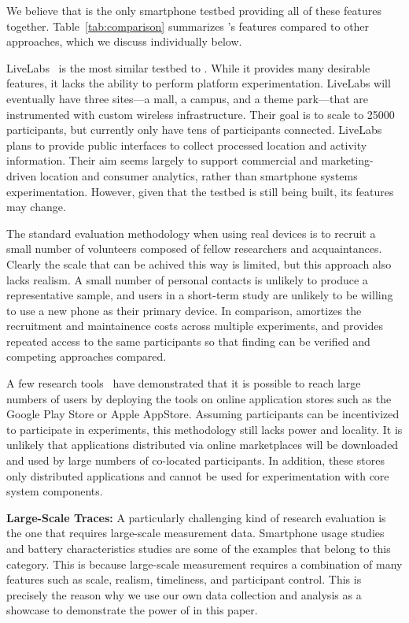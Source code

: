 We believe that \PhoneLab{} is the only smartphone testbed providing all of
these features together. Table~\ref{tab:comparison} summarizes \PhoneLab{}'s
features compared to other approaches, which we discuss individually below.

LiveLabs~\cite{livelabs} is the most similar testbed to \PhoneLab{}. While it
provides many desirable features, it lacks the ability to perform platform
experimentation. LiveLabs will eventually have three sites---a mall, a
campus, and a theme park---that are instrumented with custom wireless
infrastructure. Their goal is to scale to \num{25000} participants, but
currently only have tens of participants connected. LiveLabs plans to provide
public interfaces to collect processed location and activity information.
Their aim seems largely to support commercial and marketing-driven location
and consumer analytics, rather than smartphone systems experimentation.
However, given that the testbed is still being built, its features may
change.

The standard evaluation methodology when using real devices is to recruit a
small number of volunteers composed of fellow researchers and acquaintances.
Clearly the scale that can be achived this way is limited, but this approach
also lacks realism. A small number of personal contacts is unlikely to
produce a representative sample, and users in a short-term study are unlikely
to be willing to use a new phone as their primary device. In comparison,
\PhoneLab{} amortizes the recruitment and maintainence costs across multiple
experiments, and provides repeated access to the same participants so that
finding can be verified and competing approaches compared.

A few research tools~\cite{huang:mobisys:2010, zhang:codes:2010} have
demonstrated that it is possible to reach large numbers of users by deploying
the tools on online application stores such as the Google Play Store or Apple
AppStore. Assuming participants can be incentivized to participate in
experiments, this methodology still lacks power and locality. It is unlikely
that applications distributed via online marketplaces will be downloaded and
used by large numbers of co-located participants. In addition, these stores
only distributed applications and cannot be used for experimentation with
core system components.

{\bf Large-Scale Traces:} A particularly challenging kind of research evaluation
is the one that requires large-scale measurement data. Smartphone usage studies
and battery characteristics studies are some of the examples that belong to this
category. This is because large-scale measurement requires a combination of many
features such as scale, realism, timeliness, and participant control. This is
precisely the reason why we use our own data collection and analysis as a
showcase to demonstrate the power of \PhoneLab{} in this paper.

